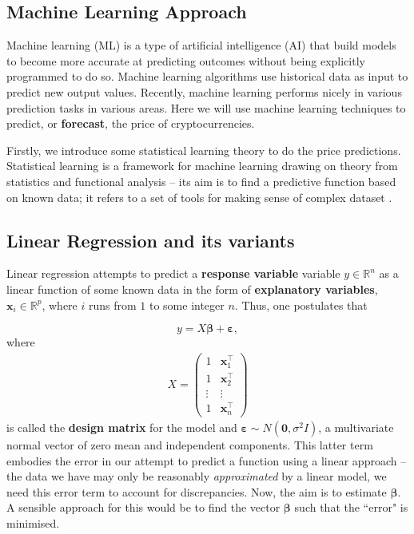 \documentclass[twoside]{report}
\begin{document}
\begin{spacing}{1}
\section{Machine Learning Approach}
Machine learning (ML) is a type of artificial intelligence (AI) that build models to become more accurate at predicting outcomes without being explicitly programmed to do so. Machine learning algorithms use historical data as input to predict new output values. Recently, machine learning performs nicely in various prediction tasks in various areas. Here we will use machine learning techniques to predict, or \textbf{forecast}, the price of cryptocurrencies.

Firstly, we introduce some statistical learning theory to do the price predictions. Statistical learning is a framework for machine learning drawing on theory from statistics and functional analysis -- its aim is to find a predictive function based on known data; it refers to a set of tools for making sense of complex dataset \cite{james2013introduction}.  











\subsection{Linear Regression and its variants}
Linear regression attempts to predict a \textbf{response variable} variable $y \in \mathbb{R}^n$ as a linear function of some known data in the form of \textbf{explanatory variables}, $\boldsymbol{x}_i \in \mathbb{R}^p$, where $i$ runs from $1$ to some integer $n$. Thus, one postulates that

\[
y= X \boldsymbol{\beta}+\boldsymbol{\varepsilon},
\]
where
\[
\begin{aligned}
X=\left(\begin{array}{cc}
1 & \mathbf{x}_{1}^{\top} \\
1 & \mathbf{x}_{2}^{\top} \\
\vdots & \vdots \\
1 & \mathbf{x}_{n}^{\top}
\end{array}\right)
\end{aligned}
\]
is called the \textbf{design matrix} for the model and $\boldsymbol{\varepsilon} \sim N(\mathbf{0}, \sigma^2 I)$, a multivariate normal vector of zero mean and independent components. This latter term embodies the error in our attempt to predict a function using a linear approach -- the data we have may only be reasonably \textit{approximated} by a linear model, we need this error term to account for discrepancies.
Now, the aim is to estimate $\boldsymbol{\beta}$. A sensible approach for this would be to find the vector $\boldsymbol{\beta}$ such that the ``error" is minimised.


\end{spacing}
\end{document}
